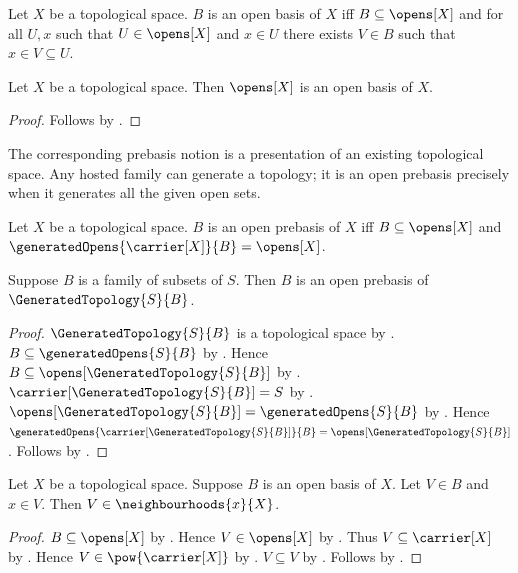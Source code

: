 \begin{definition}\label{open_basis}
    Let $X$ be a topological space.
    $B$ is an open basis of $X$ iff
        $B\subseteq\opens[X]$ and
        for all $U,x$ such that $U\in\opens[X]$ and $x\in U$
        there exists $V\in B$ such that $x\in V\subseteq U$.
\end{definition}

\begin{proposition}\label{opens_form_open_basis}
    Let $X$ be a topological space.
    Then $\opens[X]$ is an open basis of $X$.
\end{proposition}
\begin{proof}
    Follows by .
\end{proof}

The corresponding prebasis notion is a presentation of an existing
topological space.  Any hosted family can generate a topology; it is an open
prebasis precisely when it generates all the given open sets.

\begin{definition}\label{open_prebasis}
    Let $X$ be a topological space.
    $B$ is an open prebasis of $X$ iff
        $B\subseteq\opens[X]$ and
        $\generatedOpens{\carrier[X]}{B}=\opens[X]$.
\end{definition}

\begin{theorem}\label{generated_topology_generators_form_open_prebasis}
    Suppose $B$ is a family of subsets of $S$.
    Then $B$ is an open prebasis of $\GeneratedTopology{S}{B}$.
\end{theorem}
\begin{proof}
    $\GeneratedTopology{S}{B}$ is a topological space by
        .
    $B\subseteq\generatedOpens{S}{B}$ by
        .
    Hence $B\subseteq\opens[\GeneratedTopology{S}{B}]$ by
        .
    $\carrier[\GeneratedTopology{S}{B}]=S$ by
        .
    $\opens[\GeneratedTopology{S}{B}]=\generatedOpens{S}{B}$ by
        .
    Hence
        $\generatedOpens{\carrier[\GeneratedTopology{S}{B}]}{B}
            =\opens[\GeneratedTopology{S}{B}]$.
    Follows by .
\end{proof}

\begin{proposition}\label{open_basis_member_is_neighbourhood}
    Let $X$ be a topological space.
    Suppose $B$ is an open basis of $X$.
    Let $V\in B$ and $x\in V$.
    Then $V\in\neighbourhoods{x}{X}$.
\end{proposition}
\begin{proof}
    $B\subseteq\opens[X]$ by .
    Hence $V\in\opens[X]$ by .
    Thus $V\subseteq\carrier[X]$ by .
    Hence $V\in\pow{\carrier[X]}$ by .
    $V\subseteq V$ by .
    Follows by .
\end{proof}

